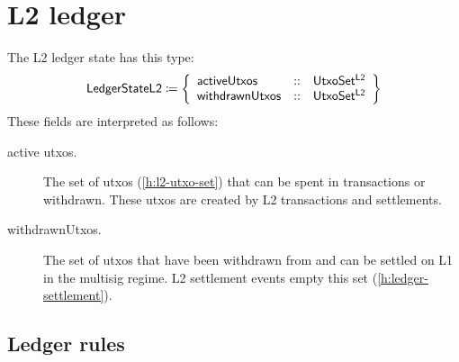 \documentclass[../hydrozoa.tex]{subfiles}
\begin{document}
\chapter{L2 ledger}%
\label{h:l2-ledger}%

The L2 ledger state has this type:
\begin{equation*}
  \mathsf{LedgerStateL2} \coloneq \left\{
  \begin{array}{lll}
    \mathsf{activeUtxos} &::& \mathsf{UtxoSet^{L2}} \\
    \mathsf{withdrawnUtxos} &::& \mathsf{UtxoSet^{L2}}
  \end{array}\right\}
\end{equation*}
These fields are interpreted as follows:
\begin{description}
  \item[active utxos.] The set of utxos (\cref{h:l2-utxo-set}) that can be spent in transactions or withdrawn.
    These utxos are created by L2 transactions and settlements.
  \item[withdrawnUtxos.] The set of utxos that have been withdrawn from  and can be settled on L1 in the multisig regime.
    L2 settlement events empty this set (\cref{h:ledger-settlement}).
    
\end{description}

\section{Ledger rules}%
\label{h:l2-ledger-rules}%
\end{document}

